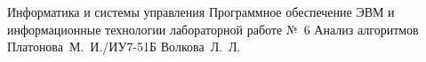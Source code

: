 
\makereporttitle
    {Информатика и системы управления}
    {Программное обеспечение ЭВМ и информационные технологии}
    {лабораторной работе №~6}
    {Анализ алгоритмов}
    {}
    {}
    {Платонова~М.~И./ИУ7-51Б}
    {Волкова~Л.~Л.}
